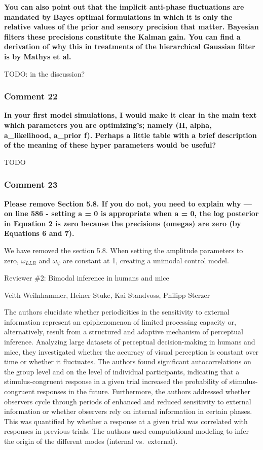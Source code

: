 \documentclass[
]{article}
\begin{document}
\textbf{You can also point out that the implicit anti-phase fluctuations
are mandated by Bayes optimal formulations in which it is only the
relative values of the prior and sensory precision that matter. Bayesian
filters these precisions constitute the Kalman gain. You can find a
derivation of why this in treatments of the hierarchical Gaussian filter
is by Mathys et al.}

TODO: in the discussion?

\hypertarget{comment-22}{%
\subsubsection{Comment 22}\label{comment-22}}

\textbf{In your first model simulations, I would make it clear in the
main text which parameters you are optimizing's; namely (H, alpha,
a\_likelihood, a\_prior f). Perhaps a little table with a brief
description of the meaning of these hyper parameters would be useful?}

TODO

\hypertarget{comment-23}{%
\subsubsection{Comment 23}\label{comment-23}}

\textbf{Please remove Section 5.8. If you do not, you need to explain
why --- on line 586 - setting a = 0 is appropriate when a = 0, the log
posterior in Equation 2 is zero because the precisions (omegas) are zero
(by Equations 6 and 7).}

We have removed the section 5.8. When setting the amplitude parameters
to zero, \(\omega_{LLR}\) and \(\omega_{\psi}\) are constant at 1,
creating a unimodal control model.

Reviewer \#2: Bimodal inference in humans and mice

Veith Weilnhammer, Heiner Stuke, Kai Standvoss, Philipp Sterzer

The authors elucidate whether periodicities in the sensitivity to
external information represent an epiphenomenon of limited processing
capacity or, alternatively, result from a structured and adaptive
mechanism of perceptual inference. Analyzing large datasets of
perceptual decision-making in humans and mice, they investigated whether
the accuracy of visual perception is constant over time or whether it
fluctuates. The authors found significant autocorrelations on the group
level and on the level of individual participants, indicating that a
stimulus-congruent response in a given trial increased the probability
of stimulus-congruent responses in the future. Furthermore, the authors
addressed whether observers cycle through periods of enhanced and
reduced sensitivity to external information or whether observers rely on
internal information in certain phases. This was quantified by whether a
response at a given trial was correlated with responses in previous
trials. The authors used computational modeling to infer the origin of
the different modes (internal vs.~external).
\end{document}
